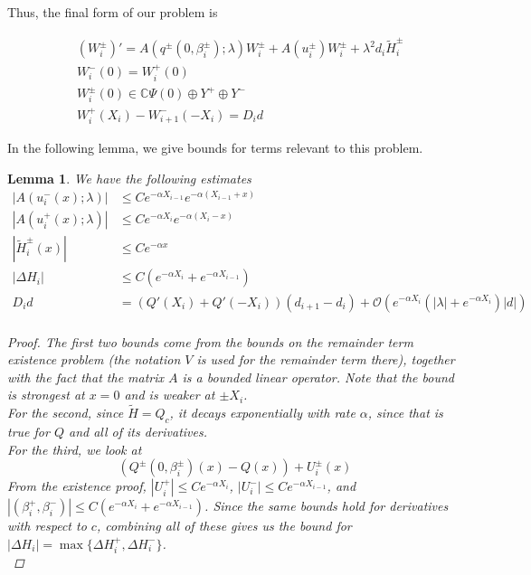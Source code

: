 \documentclass[12pt]{article}
\def\C{{\mathbb C}}
\newtheorem{lemma}{Lemma}
\begin{document}
Thus, the final form of our problem is

\begin{align}
&(W_i^\pm)' = A(q^\pm(0, \beta_i^\pm); \lambda) W_i^\pm + A(u_i^\pm) W_i^\pm + \lambda^2 d_i \tilde{H}_i^\pm \\
&W_i^-(0) = W_i^+(0) \\
&W_i^\pm(0) \in \C \Psi(0) \oplus Y^+ \oplus Y^- \\
&W_i^+(X_i) - W_{i+1}^-(-X_i) = D_i d
\end{align}

In the following lemma, we give bounds for terms relevant to this problem.


\begin{lemma}\label{problembounds}
We have the following estimates
\begin{align*}
|A(u_i^-(x); \lambda)| &\leq C e^{-\alpha X_{i-1}} e^{-\alpha(X_{i-1} + x) } \\
|A(u_i^+(x); \lambda)| &\leq C e^{-\alpha X_i} e^{-\alpha(X_i - x) } \\
|\tilde{H}_i^\pm(x)| &\leq C e^{-\alpha x} \\
|\Delta H_i| &\leq C(e^{-\alpha X_i} + e^{-\alpha X_{i-1}} ) \\
D_i d &= ( Q'(X_i) + Q'(-X_i))(d_{i+1} - d_i ) + \mathcal{O} \left( e^{-\alpha X_i} \left( |\lambda| +  e^{-\alpha X_i}  \right) |d| \right) \\
\end{align*}

\begin{proof}
The first two bounds come from the bounds on the remainder term existence problem (the notation $V$ is used for the remainder term there), together with the fact that the matrix $A$ is a bounded linear operator. Note that the bound is strongest at $x = 0$ and is weaker at $\pm X_i$. \\

For the second, since $\tilde{H} = Q_c$, it decays exponentially with rate $\alpha$, since that is true for $Q$ and all of its derivatives.\\

For the third, we look at
\[
(Q^\pm(0, \beta_i^\pm)(x) - Q(x)) + U_i^\pm(x)
\]
From the existence proof, $|U_i^+| \leq C e^{-\alpha X_i}$, $|U_i^-| \leq C e^{-\alpha X_{i-1}}$, and $|(\beta_i^+, \beta_i^-)| \leq C( e^{-\alpha X_i} + e^{-\alpha X_{i-1}})$. Since the same bounds hold for derivatives with respect to $c$, combining all of these gives us the bound for $|\Delta H_i| = \max\{\Delta H_i^+, \Delta H_i^- \}$. 
\\


\end{proof}
\end{lemma}
\end{document}

